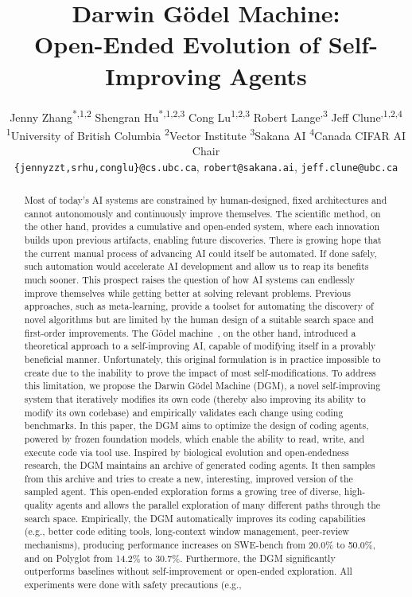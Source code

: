 \documentclass{article}
\title{Darwin G\"odel Machine:\\Open-Ended Evolution of Self-Improving Agents}
\author{%
Jenny Zhang\textsuperscript{*,1,2} \quad
Shengran Hu\textsuperscript{*,1,2,3} \quad
Cong Lu\textsuperscript{1,2,3} \quad
Robert Lange\textsuperscript{\dag,3} \quad
Jeff Clune\textsuperscript{\dag,1,2,4}
\\[1ex]
\textsuperscript{1}University of British Columbia \quad
\textsuperscript{2}Vector Institute \quad
\textsuperscript{3}Sakana AI \quad
\textsuperscript{4}Canada CIFAR AI Chair \\
\texttt{\{jennyzzt,srhu,conglu\}@cs.ubc.ca}, \texttt{robert@sakana.ai}, \texttt{jeff.clune@ubc.ca}
}
\begin{document}
\renewcommand{\thefootnote}{\fnsymbol{footnote}}
\renewcommand{\thefootnote}{\arabic{footnote}}


\maketitle

\vspace{-5pt}
\begin{abstract}
\vspace{-5pt}
Most of today’s AI systems are constrained by human-designed, fixed architectures and cannot autonomously and continuously improve themselves. The scientific method, on the other hand, provides a cumulative and open-ended system, where each innovation builds upon previous artifacts, enabling future discoveries. There is growing hope that the current manual process of advancing AI could itself be automated. If done safely, such automation would accelerate AI development and allow us to reap its benefits much sooner. This prospect raises the question of how AI systems can endlessly improve themselves while getting better at solving relevant problems. Previous approaches, such as meta-learning, provide a toolset for automating the discovery of novel algorithms but are limited by the human design of a suitable search space and first-order improvements. The G\"odel machine~\citep{schmidhuber2007godel}, on the other hand, introduced a theoretical approach to a self-improving AI, capable of modifying itself in a provably beneficial manner. Unfortunately, this original formulation is in practice impossible to create due to the inability to prove the impact of most self-modifications. To address this limitation, we propose the Darwin G\"odel Machine (DGM), a novel self-improving system that iteratively modifies its own code (thereby also improving its ability to modify its own codebase) and empirically validates each change using coding benchmarks. In this paper, the DGM aims to optimize the design of coding agents, powered by frozen foundation models, which enable the ability to read, write, and execute code via tool use. Inspired by biological evolution and open-endedness research, the DGM maintains an archive of generated coding agents. It then samples from this archive and tries to create a new, interesting, improved version of the sampled agent. This open-ended exploration forms a growing tree of diverse, high-quality agents and allows the parallel exploration of many different paths through the search space. Empirically, the DGM automatically improves its coding capabilities (e.g., better code editing tools, long-context window management, peer-review mechanisms), producing performance increases on SWE-bench from 20.0\% to 50.0\%, and on Polyglot from 14.2\% to 30.7\%. Furthermore, the DGM significantly outperforms baselines without self-improvement or open-ended exploration. All experiments were done with safety precautions (e.g., 
\end{abstract}
\end{document}
